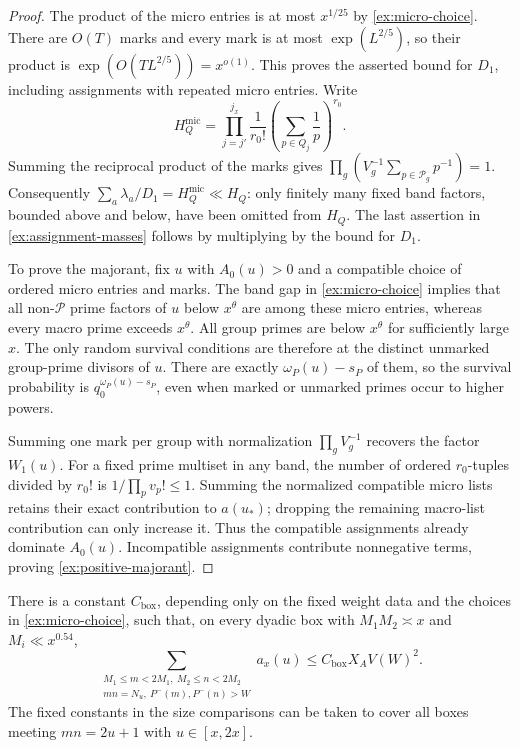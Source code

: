 \begin{proof}
The product of the micro entries is at most $x^{1/25}$ by
\eqref{ex:micro-choice}. There are $O(T)$ marks and every mark is at
most $\exp(L^{2/5})$, so their product is
$\exp(O(TL^{2/5}))=x^{o(1)}$. This proves the asserted bound for
$D_1$, including assignments with repeated micro entries.
Write
\[
 H_Q^{\mathrm{mic}}
 =\prod_{j=j'}^{j_x}\frac1{r_0!}
                      \left(\sum_{p\in Q_j}\frac1p\right)^{r_0}.
\]
Summing the reciprocal product of the marks gives
$\prod_g(V_g^{-1}\sum_{p\in\mathcal P_g}p^{-1})=1$.
Consequently $\sum_a\lambda_a/D_1=H_Q^{\mathrm{mic}}\ll H_Q$:
only finitely many fixed band factors, bounded above and below,
have been omitted from $H_Q$. The last assertion in
\eqref{ex:assignment-masses} follows by multiplying by the bound
for $D_1$.

To prove the majorant, fix $u$ with $A_0(u)>0$ and a compatible
choice of ordered micro entries and marks. The band gap in
\eqref{ex:micro-choice} implies that all non-$\mathcal P$ prime
factors of $u$ below $x^\theta$ are among these micro entries,
whereas every macro prime exceeds $x^\theta$. All group primes
are below $x^\theta$ for sufficiently large $x$. The only random
survival conditions are therefore at the distinct unmarked
group-prime divisors of $u$. There are exactly
$\omega_P(u)-s_P$ of them, so the survival probability is
$q_0^{\omega_P(u)-s_P}$, even when marked or unmarked primes
occur to higher powers.

Summing one mark per group with normalization $\prod_g V_g^{-1}$
recovers the factor $W_1(u)$. For a fixed prime multiset in any
band, the number of ordered $r_0$-tuples divided by $r_0!$ is
$1/\prod_p v_p!\le1$. Summing the normalized compatible micro
lists retains their exact contribution to $a(u_*)$; dropping the
remaining macro-list contribution can only increase it. Thus
the compatible assignments already dominate $A_0(u)$.
Incompatible assignments contribute nonnegative terms, proving
\eqref{ex:positive-majorant}.
\end{proof}

\begin{lemma}\label{ex:box}
There is a constant $C_{\mathrm{box}}$, depending only on the
fixed weight data and the choices in \eqref{ex:micro-choice}, such
that, on every dyadic box with $M_1M_2\asymp x$ and
$M_i\ll x^{0.54}$,
\begin{equation}\label{ex:box-bound}
 \sum_{\substack{M_1\le m<2M_1,\ M_2\le n<2M_2\\
                 mn=N_u,\ P^-(m),P^-(n)>W}}
       a_x(u)\le C_{\mathrm{box}}X_AV(W)^2.
\end{equation}
The fixed constants in the size comparisons can be taken to cover
all boxes meeting $mn=2u+1$ with $u\in[x,2x]$.
\end{lemma}


